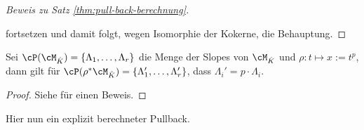 \begin{proof}[Beweis zu Satz \ref{thm:pull-back-berechnung}]
\begin{center}
\end{center}
fortsetzen und damit folgt, wegen Isomorphie der Kokerne, die Behauptung.
\end{proof}
%
\begin{lem}\label{lem:slope-pb-multiplikation}
Sei $\cP(\cM_{\hat K})=\{\Lambda_1,\dots,\Lambda_r\}$ die Menge der Slopes von
$\cM_{\hat K}$ und $\rho:t\mapsto x:=t^p$, dann gilt für $\cP(\rho^*\cM_{\hat
K})=\{\Lambda_1',\dots,\Lambda_r'\}$, dass $\Lambda_i'=p\cdot\Lambda_i$.
\end{lem}
\begin{proof}
Siehe \cite[5.4.3]{sabbah_cimpa90} für einen Beweis.
\end{proof}
\begin{comment}
\begin{proof}
Sei $\cM_{\hat K}=\cD_{\hat K}\slash \cD_{\hat K}\cdot P$ mit $P=\sum
a_i(x)\partial_x^i$, dann ist
$\rho^*\cM_{\hat K}\cong\cD_{\hat L}\slash \cD_{\hat L}\cdot P'$ mit
\begin{align*}
H(P'(t,\partial_t)) &=H(P(\rho(t),\rho'(t)^{-1}\partial_t))
\\&=H(\sum_i a_i(\rho(t))(\rho'(t)^{-1}\partial_t)^ii)
\\&=H(\sum_i a_i(\rho(t))(\rho'(t)^{-1}\partial_t)^ii)
\\&=H(\sum_i a_i(t^p)((p\cdot t^{p-1})^{-1}\partial_t)^i)
\\&=H(\sum_i a_i(t^p)(p\cdot t^{p-1})^{-i}\partial_t^i)
\\&=H(\sum_i a_i(t^p)t^{-i(p-1)}\partial_t^i)
\\&=\dots %
\end{align*}
\end{proof}
\end{comment}
%
Hier nun ein explizit berechneter Pullback.
